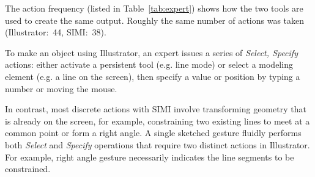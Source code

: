 The action frequency (listed in Table~\ref{tab:expert}) shows how the
two tools are used to create the same output. Roughly the same number
of actions was taken (Illustrator:~44, SIMI:~38).

To make an object using Illustrator, an expert issues a series of
\textit{Select, Specify} actions: either activate a persistent tool
(e.g. line mode) or select a modeling element (e.g. a line on the
screen), then specify a value or position by typing a number or moving
the mouse.

In contrast, most discrete actions with SIMI involve transforming
geometry that is already on the screen, for example, constraining two
existing lines to meet at a common point or form a right angle. A
single sketched gesture fluidly performs both \textit{Select} and
\textit{Specify} operations that require two distinct actions in
Illustrator. For example, right angle gesture necessarily indicates
the line segments to be constrained.

